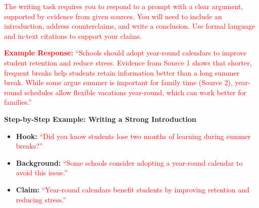 \documentclass[12pt]{article}
\begin{document}
\vspace{1em}

\begin{tcolorbox}[colframe=black!60, colback=white, 
coltitle=black, colbacktitle=black!15, fonttitle=\bfseries\Large, 
title=What does the Writing Task Look Like?, halign title=center, left=10pt, right=10pt, top=10pt, bottom=15pt]
\textcolor{red}{The writing task requires you to respond to a prompt with a clear argument, supported by evidence from given sources. You will need to include an introduction, address counterclaims, and write a conclusion. Use formal language and in-text citations to support your claims.}
\end{tcolorbox}

\vspace{1em}

\begin{tcolorbox}[colframe=black!60, colback=white, 
coltitle=black, colbacktitle=black!15, fonttitle=\bfseries\Large, 
title=Example Test Prompt, halign title=center, left=10pt, right=10pt, top=10pt, bottom=15pt]
\textcolor{red}{\textbf{Example Response:}} \textcolor{red}{“Schools should adopt year-round calendars to improve student retention and reduce stress. Evidence from Source 1 shows that shorter, frequent breaks help students retain information better than a long summer break. While some argue summer is important for family time (Source 2), year-round schedules allow flexible vacations year-round, which can work better for families.”}
\end{tcolorbox}

\vspace{1em}

\begin{tcolorbox}[colframe=black!60, colback=white, 
coltitle=black, colbacktitle=black!15, fonttitle=\bfseries\Large, 
title=Examples, halign title=center, left=10pt, right=10pt, top=10pt, bottom=15pt]
\textbf{Step-by-Step Example: Writing a Strong Introduction}
\begin{itemize}
    \item \textbf{Hook:} \textcolor{red}{“Did you know students lose two months of learning during summer breaks?”}
    \item \textbf{Background:} \textcolor{red}{“Some schools consider adopting a year-round calendar to avoid this issue.”}
    \item \textbf{Claim:} \textcolor{red}{“Year-round calendars benefit students by improving retention and reducing stress.”}
\end{itemize}
\end{tcolorbox}
\end{document}
